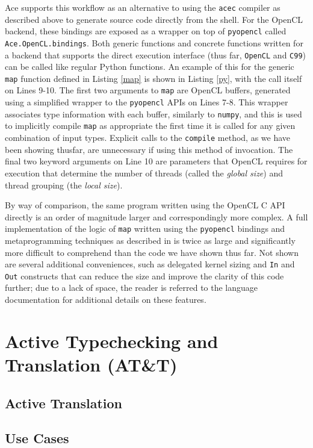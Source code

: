 \documentclass{sig-alternate}
\begin{document}
Ace supports this workflow as an alternative to using the \verb|acec| compiler as described above to generate  source code directly from the shell. For the OpenCL backend, these bindings are exposed as a wrapper on top of \verb|pyopencl| called \verb|Ace.OpenCL.bindings|. Both generic functions and concrete functions written for a backend that supports the direct execution interface (thus far, \verb|OpenCL| and \verb|C99|) can be called like regular Python functions. An example of this for the generic \verb|map| function defined in Listing \ref{map} is shown in Listing \ref{py}, with the call itself on Lines 9-10. The first two arguments to \verb|map| are OpenCL buffers, generated using a simplified wrapper to the \verb|pyopencl| APIs on Lines 7-8. This wrapper associates type information with each buffer, similarly to \verb|numpy|, and this is used to implicitly compile \verb|map| as appropriate the first time it is called for any given combination of input types. Explicit calls to the \verb|compile| method, as we have been showing thusfar, are unnecessary if using this method of invocation. The final two keyword arguments on Line 10 are parameters that OpenCL requires for execution that determine the number of threads (called the {\em global size}) and thread grouping (the {\em local size}). 

By way of comparison, the same program written using the OpenCL C API directly is an order of magnitude larger and correspondingly more complex. A full implementation of the logic of \verb|map| written using the \verb|pyopencl| bindings and metaprogramming techniques as described in \cite{pyopencl} is twice as large and significantly more difficult to comprehend than the code we have shown thus far. Not shown are several additional conveniences, such as delegated kernel sizing and \verb|In| and \verb|Out| constructs that can reduce the size and improve the clarity of this code further; due to a lack of space, the reader is referred to the language documentation for additional details on these features.


\section{Active Typechecking and\\Translation (AT\&T)}\label{att}
\subsection{Active Translation}\label{translation}
\subsection{Use Cases}\label{usecases}
\end{document}
